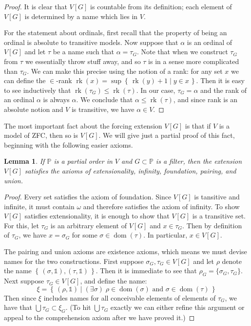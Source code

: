 \documentclass[11pt,oneside]{amsbook}
\newcommand{\set}[1]{\left\{\,#1\,\right\}}
\DeclareMathOperator{\dom}{dom}
\DeclareMathOperator{\rk}{rk}
\theoremstyle{definition}
\theoremstyle{plain}
\newtheorem{lemma}[theorem]{Lemma}
\theoremstyle{definition}
\theoremstyle{remark}
\numberwithin{equation}{section}
\numberwithin{figure}{section}
\begin{document}
\begin{proof}
  It is clear that $V[G]$ is countable from its definition; each element of $V[G]$ is determined by a name which lies in $V$.

  For the statement about ordinals, first recall that the property of being an ordinal is absolute to transitive models. Now suppose that $\alpha$ is an ordinal of $V[G]$ and let $\tau$ be a name such that $\alpha=\tau_G$. Note that when we construct $\tau_G$ from $\tau$ we essentially throw stuff away, and so $\tau$ is in a sense more complicated than $\tau_G$. We can make this precise using the notion of a rank: for any set $x$ we can define the $\in$-rank $\rk(x)=\sup\set{\rk(y)+1\mid y\in x}$. Then it is easy to see inductively that $\rk(\tau_G)\leq\rk(\tau)$. In our case, $\tau_G=\alpha$ and the rank of an ordinal $\alpha$ is always $\alpha$. We conclude that $\alpha\leq\rk(\tau)$, and since rank is an absolute notion and $V$ is transitive, we have $\alpha\in V$.
\end{proof}

The most important fact about the forcing extension $V[G]$ is that if $V$ is a model of ZFC, then so is $V[G]$. We will give just a partial proof of this fact, beginning with the following easier axioms.

\begin{lemma}
  If $\mathbb P$ is a partial order in $V$ and $G\subset\mathbb P$ is a filter, then the extension $V[G]$ satisfies the axioms of extensionality, infinity, foundation, pairing, and union.
\end{lemma}

\begin{proof}
  Every set satisfies the axiom of foundation. Since $V[G]$ is tansitive and infinite, it must contain $\omega$ and therefore satisfies the axiom of infinity. To show $V[G]$ satisfies extensionality, it is enough to show that $V[G]$ is a transitive set. For this, let $\tau_G$ is an arbitrary element of $V[G]$ and $x\in\tau_G$. Then by definition of $\tau_G$, we have $x=\sigma_G$ for some $\sigma\in\dom(\tau)$. In particular, $x\in V[G]$.

  The pairing and union axioms are existence axioms, which means we must devise names for the two constructions. First suppose $\sigma_G,\tau_G\in V[G]$ and let $\rho$ denote the name $\set{(\sigma,\mathbb1),(\tau,\mathbb1)}$. Then it is immediate to see that $\rho_G=\{\sigma_G,\tau_G\}$. Next suppose $\tau_G\in V[G]$, and define the name:
  \[\xi=\set{(\rho,\mathbb1)\mid(\exists\sigma)\;\rho\in\dom(\sigma)\text{ and }\sigma\in\dom(\tau)}
  \]
  Then since $\xi$ includes names for all conceivable elements of elements of $\tau_G$, we have that $\bigcup\tau_G\subset\xi_G$. (To hit $\bigcup\tau_G$ exactly we can either refine this argument or appeal to the comprehension axiom after we have proved it.)
\end{proof}
\end{document}
